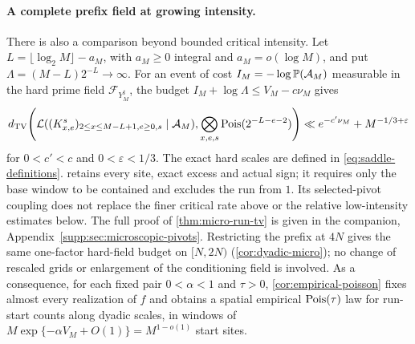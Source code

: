 \paragraph{A complete prefix field at growing intensity.}
There is also a comparison beyond bounded critical intensity. Let
$L=\lfloor\log_2M\rfloor-a_M$, with $a_M\ge0$ integral and
$a_M=o(\log M)$, and put $\Lambda=(M-L)2^{-L}\to\infty$.
For an event of cost $I_M=-\log\mathbb P(\mathcal A_M)$ measurable in the
hard prime field $\mathcal F_{Y_M^\sharp}$, the budget
$I_M+\log\Lambda\le V_M-c\nu_M$ gives
\[
 d_{\mathrm{TV}}\!\left(\mathcal L((K^s_{x,e})_{2\le x\le M-L+1,e\ge0,s}\mid\mathcal A_M),
       \bigotimes_{x,e,s}\operatorname{Pois}(2^{-L-e-2})\right)
 \ll e^{-c'\nu_M}+M^{-1/3+\varepsilon}
\]
for $0<c'<c$ and $0<\varepsilon<1/3$.
The exact hard scales are defined in \eqref{eq:saddle-definitions}.
 retains every site, exact excess and actual sign;
it requires only the base window to be contained and excludes the run
from $1$. Its selected-pivot coupling does not replace the finer critical
rate above or the relative low-intensity estimates below. The full proof
of \cref{thm:micro-run-tv} is given in the companion,
Appendix~\ref{supp:sec:microscopic-pivots}.
Restricting the prefix at $4N$ gives the same one-factor hard-field
budget on $[N,2N)$ (\cref{cor:dyadic-micro}); no change of rescaled
grids or enlargement of the conditioning field is involved.
As a consequence, for each fixed pair $0<\alpha<1$ and $\tau>0$,
\cref{cor:empirical-poisson} fixes almost every realization of $f$ and
obtains a spatial empirical $\operatorname{Pois}(\tau)$ law for run-start counts along
dyadic scales, in windows of $M\exp\{-\alpha V_M+O(1)\}=M^{1-o(1)}$
start sites.

